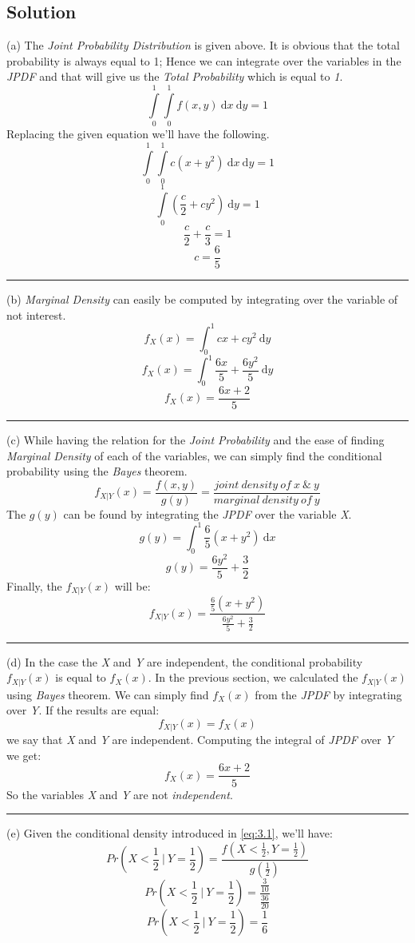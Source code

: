 \documentclass[12pt]{article}
\numberwithin{equation}{section}
\numberwithin{table}{section}
\numberwithin{figure}{section}
\begin{document}
\subsection*{Solution}
(a) The \textit{Joint Probability Distribution} is given above. It is obvious that the total probability is always equal to 1; Hence we can integrate over the variables in the \textit{JPDF} and that will give us the \textit{Total Probability} which is equal to \textit{1}.
$$
\int\limits_{0}^{1} \int\limits_{0}^{1}f(x, y)\ \mathrm{d}x \ \mathrm{d}y=1
$$
Replacing the given equation we'll have the following.
$$
\int\limits_{0}^{1} \int\limits_{0}^{1}c(x+ y^2)\ \mathrm{d}x \ \mathrm{d}y=1
$$ 
$$
\int\limits_{0}^{1}(\frac{c}{2} + cy^2) \ \mathrm{d}y=1
$$ 
$$
	\frac{c}{2} + \frac{c}{3} = 1
$$ 
$$
	\boxed{c = \frac{6}{5}}
$$
\noindent\rule{\textwidth}{.5pt}
(b) \textit{Marginal Density} can easily be computed by integrating over the variable of not interest. 
$$
	f_X (x) = \int_{0}^{1} cx + cy^2 \ \mathrm{d}y
$$
$$
	f_X (x) = \int_{0}^{1} \frac{6x}{5} + \frac{6y^2}{5} \ \mathrm{d}y
$$
$$
	\boxed{f_X (x) = \frac{6x+2}{5}}
$$
\noindent\rule{\textwidth}{.5pt}
(c) While having the relation for the \textit{Joint Probability} and the ease of finding \textit{Marginal Density} of each of the variables, we can simply find the conditional probability using the \textit{Bayes} theorem.
\begin{equation}\label{eq:3.1}
	f_{X|Y} (x) = \frac{f(x, y)}{g(y)}  = \frac{joint\ density\ of\ x\ \&\ y}{marginal\ density\ of\ y}
\end{equation}
The $g(y)$ can be found by integrating the \textit{JPDF} over the variable \textit{X}.
$$
g(y) = \int_{0}^{1} \frac{6}{5}(x+y^2)\ \mathrm{d}x
$$
$$
g(y) = \frac{6y^2}{5} + \frac{3}{2}
$$
Finally, the $f_{X|Y} (x)$ will be:
$$
	f_{X|Y} (x) = \frac{\frac{6}{5}(x+y^2)}{\frac{6y^2}{5} + \frac{3}{2}}
$$
\noindent\rule{\textwidth}{.5pt}
(d) In the case the \textit{X} and \textit{Y} are independent, the conditional probability $f_{X|Y} (x)$ is equal to $f_{X} (x)$. In the previous section, we calculated the $f_{X|Y} (x)$ using \textit{Bayes} theorem. We can simply find $f_{X} (x)$ from the \textit{JPDF} by integrating over \textit{Y}. If the results are equal:
$$
	f_{X|Y} (x) = f_{X} (x)
$$
we say that \textit{X} and \textit{Y} are independent.
Computing the integral of \textit{JPDF} over \textit{Y} we get:
$$
	f_X (x) = \frac{6x+2}{5}
$$
So the variables \textit{X} and \textit{Y} are not \textit{independent}.

\noindent\rule{\textwidth}{.5pt}
(e) Given the conditional density introduced in \ref{eq:3.1}, we'll have:
$$
	Pr(X < \frac{1}{2}\ |\ Y = \frac{1}{2}) = \frac{f(X < \frac{1}{2}, Y = \frac{1}{2})}{g(\frac{1}{2})}
$$
$$
	Pr(X < \frac{1}{2}\ |\ Y = \frac{1}{2}) = \frac{\frac{3}{10}}{\frac{36}{20}}
$$
$$
	Pr(X < \frac{1}{2}\ |\ Y = \frac{1}{2}) = \frac{1}{6}
$$
\newpage
\end{document}
